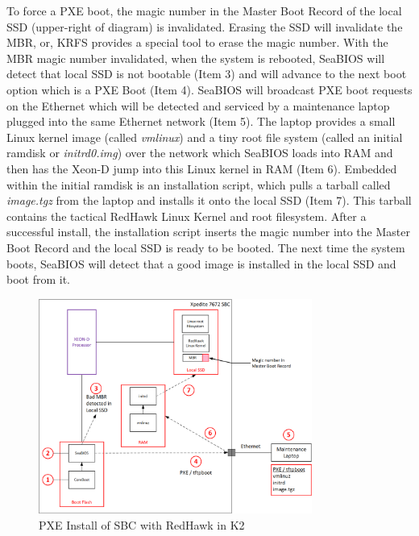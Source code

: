 \documentclass[12pt]{article}
\begin{document}
To force a PXE boot, the magic number in the Master Boot Record of the local SSD
(upper-right of diagram) is invalidated.  Erasing the SSD will invalidate the
MBR, or, KRFS provides a special tool to erase the magic number.  With the MBR
magic number invalidated, when the system is rebooted, SeaBIOS will detect that
local SSD is not bootable (Item 3) and will advance to the next boot option
which is a PXE Boot (Item 4).  SeaBIOS will broadcast PXE boot requests on the
Ethernet which will be detected and serviced by a maintenance laptop plugged
into the same Ethernet network (Item 5).  The laptop provides a small Linux
kernel image (called \emph{vmlinux}) and a tiny root file system (called an
initial ramdisk or \emph{initrd0.img}) over the network which SeaBIOS loads into
RAM and then has the Xeon-D jump into this Linux kernel in RAM (Item 6).
Embedded within the initial ramdisk is an installation script, which pulls a
tarball called \emph{image.tgz} from the laptop and installs it onto the local
SSD (Item 7).  This tarball contains the tactical RedHawk Linux Kernel and root
filesystem.  After a successful install, the installation script inserts the
magic number into the Master Boot Record and the local SSD is ready to be
booted.  The next time the system boots, SeaBIOS will detect that a good image
is installed in the local SSD and boot from it.

\begin{figure}[H]
    \begin{center}
    \includegraphics[width=0.8\textwidth]{img/pxe_install}
    \caption{PXE Install of SBC with RedHawk in K2}
    \label{fig:pxe_install}
    \end{center}
\end{figure}
\end{document}
